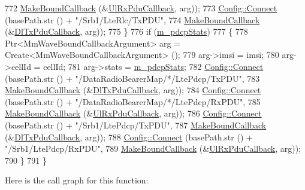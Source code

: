 \begin{DoxyCode}
772                        \hyperlink{group__makeboundcallback_ga1725d6362e6065faa0709f7c93f8d770}{MakeBoundCallback} (&\hyperlink{namespacens3_a269527c03607c9c885d7cff7667ec5e0}{UlRxPduCallback}, arg));
773       \hyperlink{group__config_ga4014f151241cd0939b6cb64409605736}{Config::Connect} (basePath.str () + \textcolor{stringliteral}{"/Srb1/LteRlc/TxPDU"},
774                        \hyperlink{group__makeboundcallback_ga1725d6362e6065faa0709f7c93f8d770}{MakeBoundCallback} (&\hyperlink{namespacens3_a7de82f7ed9986b9bcb67951f61e02ff4}{DlTxPduCallback}, arg));
775     \}
776   \textcolor{keywordflow}{if} (\hyperlink{classns3_1_1MmWaveBearerStatsConnector_a6523c73cc057ed84faa3ddfc944ff67f}{m\_pdcpStats})
777     \{
778       Ptr<MmWaveBoundCallbackArgument> arg = Create<MmWaveBoundCallbackArgument> ();
779       arg->imsi = imsi;
780       arg->cellId = cellId; 
781       arg->stats = \hyperlink{classns3_1_1MmWaveBearerStatsConnector_a6523c73cc057ed84faa3ddfc944ff67f}{m\_pdcpStats};
782       \hyperlink{group__config_ga4014f151241cd0939b6cb64409605736}{Config::Connect} (basePath.str () + \textcolor{stringliteral}{"/DataRadioBearerMap/*/LtePdcp/TxPDU"},
783                        \hyperlink{group__makeboundcallback_ga1725d6362e6065faa0709f7c93f8d770}{MakeBoundCallback} (&\hyperlink{namespacens3_a7de82f7ed9986b9bcb67951f61e02ff4}{DlTxPduCallback}, arg));
784       \hyperlink{group__config_ga4014f151241cd0939b6cb64409605736}{Config::Connect} (basePath.str () + \textcolor{stringliteral}{"/DataRadioBearerMap/*/LtePdcp/RxPDU"},
785                        \hyperlink{group__makeboundcallback_ga1725d6362e6065faa0709f7c93f8d770}{MakeBoundCallback} (&\hyperlink{namespacens3_a269527c03607c9c885d7cff7667ec5e0}{UlRxPduCallback}, arg));
786       \hyperlink{group__config_ga4014f151241cd0939b6cb64409605736}{Config::Connect} (basePath.str () + \textcolor{stringliteral}{"/Srb1/LtePdcp/TxPDU"},
787                        \hyperlink{group__makeboundcallback_ga1725d6362e6065faa0709f7c93f8d770}{MakeBoundCallback} (&\hyperlink{namespacens3_a7de82f7ed9986b9bcb67951f61e02ff4}{DlTxPduCallback}, arg));
788       \hyperlink{group__config_ga4014f151241cd0939b6cb64409605736}{Config::Connect} (basePath.str () + \textcolor{stringliteral}{"/Srb1/LtePdcp/RxPDU"},
789                        \hyperlink{group__makeboundcallback_ga1725d6362e6065faa0709f7c93f8d770}{MakeBoundCallback} (&\hyperlink{namespacens3_a269527c03607c9c885d7cff7667ec5e0}{UlRxPduCallback}, arg));
790     \}
791 \}
\end{DoxyCode}


Here is the call graph for this function\+:




